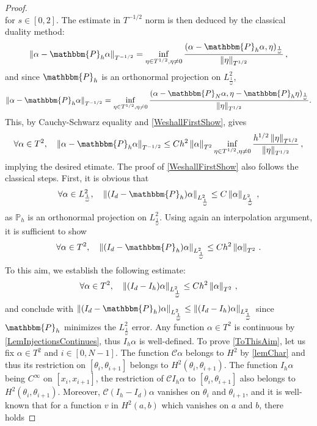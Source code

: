 \documentclass[a4paper]{article}
\begin{document}
\begin{proof}
\begin{equation}
	\label{WeshallFirstShow}
\end{equation}
for $s \in [0,2]$. The estimate in $T^{-1/2}$ norm is then deduced by the classical duality method:
\[\norm{\alpha - \mathbbm{P}_h \alpha}_{T^{-1/2}} = \inf_{\eta \in T^{1/2}, \eta \neq 0} \dfrac{(\alpha - \mathbbm{P}_h \alpha,\eta)_{\frac{1}{\omega}}}{\norm{\eta}_{T^{1/2}}}\,,\]
and since $\mathbbm{P}_h$ is an orthonormal projection on $L^2_\frac{1}{\omega}$, 
\[\norm{\alpha - \mathbbm{P}_h \alpha}_{T^{-1/2}} = \inf_{\eta \in T^{1/2}, \eta \neq 0} \dfrac{(\alpha - \mathbbm{P}_N \alpha,\eta -\mathbbm{P}_h \eta )_{\frac{1}{\omega}}}{\norm{\eta}_{T^{1/2}}}.\]
This, by Cauchy-Schwarz equality and \eqref{WeshallFirstShow}, gives 
\[\forall \alpha \in T^2, \quad \norm{\alpha- \mathbbm{P}_h\alpha}_{T^{-1/2}} \leq Ch^2 \norm{\alpha}_{T^2}\inf_{\eta \in T^{1/2}, \eta \neq 0}  \frac{h^{1/2} \norm{\eta}_{T^{1/2}}}{\norm{\eta}_{T^{1/2}}}\,,\] 
implying the desired etimate. The proof of \eqref{WeshallFirstShow} also follows the classical steps. First, it is obvious that 
\[\forall \alpha \in L^2_\frac{1}{\omega}, \quad \norm{(I_d - \mathbbm{P}_h)\alpha}_{L^2_\frac{1}{\omega}} \leq C \norm{\alpha}_{L^2_\frac{1}{\omega}}\,,\]
as $\mathbb{P}_h$ is an orthonormal projection on $L^2_\frac{1}{\omega}$. Using again an interpolation argument, it is sufficient to show
\begin{equation}
	\forall \alpha \in T^2, \quad \norm{(I_d - \mathbbm{P}_h)\alpha}_{L^2_\frac{1}{\omega}} \leq C h^2 \norm{\alpha}_{T^2}\,.
	\label{WeOnlyNeedToShow}
\end{equation}
To this aim, we establish the following estimate:
\begin{equation}
	\forall \alpha \in T^2, \quad \left\|(I_d - I_h)\alpha\right\|_{L^2_\frac{1}{\omega}} \leq C h^2 \left\|\alpha\right\|_{T^2}\,,
	\label{ToThisAim}
\end{equation}
and conclude with $\norm{(I_d - \mathbbm{P}_h)\alpha}_{L^2_\frac{1}{\omega}} \leq \norm{(I_d - I_h)\alpha}_{L^2_\frac{1}{\omega}}$ since $\mathbbm{P}_h$ minimizes the $L^2_\frac{1}{\omega}$ error. Any function $\alpha \in T^2$ is continuous by \autoref{LemInjectionsContinues}, thus $I_h \alpha$ is well-defined. To prove \eqref{ToThisAim}, let us fix $\alpha \in T^2$ and $i \in [0,N-1]$.
The function $\mathcal{C}\alpha$ belongs to $H^2$ by \autoref{lemChar} and thus its restriction on $[\theta_i,\theta_{i+1}]$ belongs to $H^2(\theta_{i},\theta_{i+1})$. The function $I_h\alpha$ being $C^{\infty}$ on $[x_i,x_{i+1}]$, the restriction of $\mathcal{C}I_h\alpha$ to $[\theta_i,\theta_{i+1}]$ also belongs to $H^2(\theta_i,\theta_{i+1})$. Moreover, $\mathcal{C}(I_h - I_d)\alpha$ vanishes on $\theta_i$ and $\theta_{i+1}$, and it is well-known that for a function $v$ in $H^2(a,b)$ which vanishes on $a$ and $b$, there holds 

\end{proof}
\end{document}
